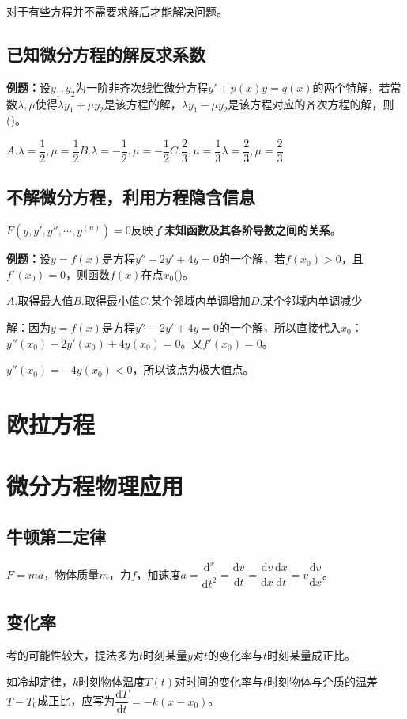 \documentclass[UTF8, 12pt]{ctexart}
\begin{document}
对于有些方程并不需要求解后才能解决问题。

\subsection{已知微分方程的解反求系数}

\textbf{例题：}设$y_1,y_2$为一阶非齐次线性微分方程$y'+p(x)y=q(x)$的两个特解，若常数$\lambda,\mu$使得$\lambda y_1+\mu y_2$是该方程的解，$\lambda y_1-\mu y_2$是该方程对应的齐次方程的解，则()。

$A.\lambda=\dfrac{1}{2},\mu=\dfrac{1}{2}$\qquad$B.\lambda=-\dfrac{1}{2},\mu=-\dfrac{1}{2}$\qquad$C.\dfrac{2}{3},\mu=\dfrac{1}{3}$\qquad$\lambda=\dfrac{2}{3},\mu=\dfrac{2}{3}$

\subsection{不解微分方程，利用方程隐含信息}

$F(y,y',y'',\cdots,y^{(n)})=0$反映了\textbf{未知函数及其各阶导数之间的关系}。

\textbf{例题：}设$y=f(x)$是方程$y''-2y'+4y=0$的一个解，若$f(x_0)>0$，且$f'(x_0)=0$，则函数$f(x)$在点$x_0$()。

$A.$取得最大值\qquad$B.$取得最小值\qquad$C.$某个邻域内单调增加\qquad$D.$某个邻域内单调减少

解：因为$y=f(x)$是方程$y''-2y'+4y=0$的一个解，所以直接代入$x_0$：$y''(x_0)-2y'(x_0)+4y(x_0)=0$。又$f'(x_0)=0$。

$y''(x_0)=-4y(x_0)<0$，所以该点为极大值点。

\section{欧拉方程}

\section{微分方程物理应用}

\subsection{牛顿第二定律}

$F=ma$，物体质量$m$，力$f$，加速度$a=\dfrac{\textrm{d}^x}{\textrm{d}t^2}=\dfrac{\textrm{d}v}{\textrm{d}t}=\dfrac{\textrm{d}v}{\textrm{d}x}\dfrac{\textrm{d}x}{\textrm{d}t}=v\dfrac{\textrm{d}v}{\textrm{d}x}$。

\subsection{变化率}

考的可能性较大，提法多为$t$时刻某量$y$对$t$的变化率与$t$时刻某量成正比。

如冷却定律，$k$时刻物体温度$T(t)$对时间的变化率与$t$时刻物体与介质的温差$T-T_0$成正比，应写为$\dfrac{\textrm{d}T}{\textrm{d}t}=-k(x-x_0)$。
\end{document}

